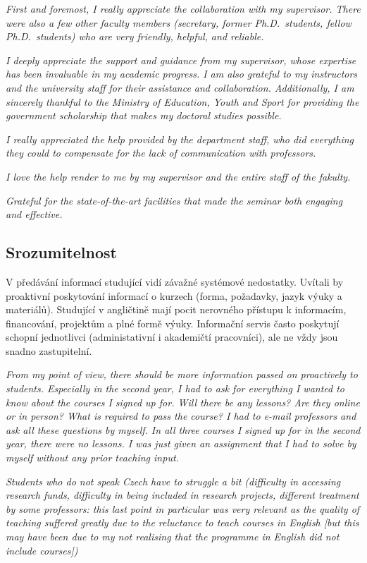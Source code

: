 \documentclass[
  czech,
  14pt,
  a4paper,
  DIV=11,
  numbers=noendperiod]{scrreprt}
\begin{document}
\emph{First and foremost, I really appreciate the collaboration with my
supervisor. There were also a few other faculty members (secretary,
former Ph.D.~students, fellow Ph.D.~students) who are very friendly,
helpful, and reliable.}

\emph{I deeply appreciate the support and guidance from my supervisor,
whose expertise has been invaluable in my academic progress. I am also
grateful to my instructors and the university staff for their assistance
and collaboration. Additionally, I am sincerely thankful to the Ministry
of Education, Youth and Sport for providing the government scholarship
that makes my doctoral studies possible.}

\emph{I really appreciated the help provided by the department staff,
who did everything they could to compensate for the lack of
communication with professors.}

\emph{I love the help render to me by my supervisor and the entire staff
of the fakulty.}

\emph{Grateful for the state-of-the-art facilities that made the seminar
both engaging and effective.}

\subsection{Srozumitelnost}\label{srozumitelnost-1}

V předávání informací studující vidí závažné systémové nedostatky.
Uvítali by proaktivní poskytování informací o kurzech (forma, požadavky,
jazyk výuky a materiálů). Studující v angličtině mají pocit nerovného
přístupu k informacím, financování, projektům a plné formě výuky.
Informační servis často poskytují schopní jednotlivci (administativní i
akademičtí pracovníci), ale ne vždy jsou snadno zastupitelní.

\emph{From my point of view, there should be more information passed on
proactively to students. Especially in the second year, I had to ask for
everything I wanted to know about the courses I signed up for. Will
there be any lessons? Are they online or in person? What is required to
pass the course? I had to e-mail professors and ask all these questions
by myself. In all three courses I signed up for in the second year,
there were no lessons. I was just given an assignment that I had to
solve by myself without any prior teaching input.}

\emph{Students who do not speak Czech have to struggle a bit (difficulty
in accessing research funds, difficulty in being included in research
projects, different treatment by some professors: this last point in
particular was very relevant as the quality of teaching suffered greatly
due to the reluctance to teach courses in English {[}but this may have
been due to my not realising that the programme in English did not
include courses{]})}
\end{document}
